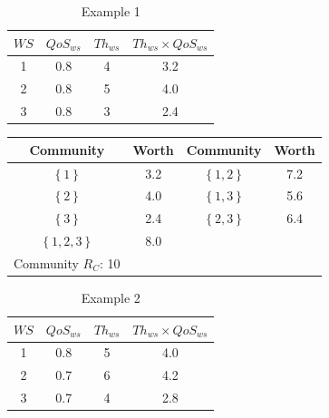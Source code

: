 \documentclass[10pt,journal,cspaper,compsoc]{IEEEtran}
\begin{document}
\begin{table}[!t]
\renewcommand{\arraystretch}{1.3}
\caption{Example 1}
\label{example_1}
\centering
\begin{tabular}{c c c c}
\hline
$WS$ & $QoS_{ws}$ & $Th_{ws}$ & $Th_{ws} \times QoS_{ws}$\\
\hline
1 & 0.8 & 4 & 3.2\\
2 & 0.8 & 5 & 4.0\\
3 & 0.8 & 3 & 2.4\\
\hline
\end{tabular}
\end{table}

\begin{table}[!t]
\renewcommand{\arraystretch}{1.3}
\label{example_1_2}
\centering
\begin{tabular}{c c || c c}
\hline
Community & Worth & Community & Worth\\
\hline
$\left\{1\right\}$ & 3.2 & $\left\{1,2\right\}$ & 7.2\\
$\left\{2\right\}$ & 4.0 & $\left\{1,3\right\}$ & 5.6\\
$\left\{3\right\}$ & 2.4 & $\left\{2,3\right\}$ & 6.4\\
$\left\{1,2,3\right\}$ & 8.0\\
\hline
Community $R_C$: 10\\
\hline
\end{tabular}
\end{table}

\begin{table}[!t]
\renewcommand{\arraystretch}{1.3}
\caption{Example 2}
\label{example_2}
\centering
\begin{tabular}{c c c c}
\hline
$WS$ & $QoS_{ws}$ & $Th_{ws}$ & $Th_{ws} \times QoS_{ws}$\\
\hline
1 & 0.8 & 5 & 4.0\\
2 & 0.7 & 6 & 4.2\\
3 & 0.7 & 4 & 2.8\\
\hline
\end{tabular}
\end{table}
\end{document}
